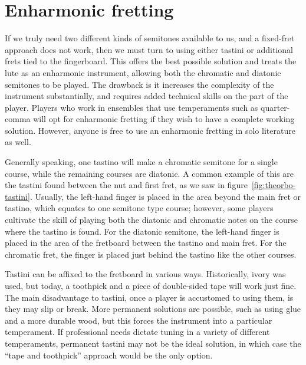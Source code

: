 \section{Enharmonic fretting}

If we truly need two different kinds of semitones available to us, and a fixed-fret
approach does not work, then we must turn to using either tastini or additional frets
tied to the fingerboard.  This offers the best possible solution and treats the lute as
an enharmonic instrument, allowing both the chromatic and diatonic semitones to be
played. The drawback is it increases the complexity of the instrument substantially,
and requires added technical skills on the part of the player. Players who work in
ensembles that use temperaments such as quarter-comma will opt for enharmonic fretting
if they wish to have a complete working solution. However, anyone is free to use an
enharmonic fretting in solo literature as well.

Generally speaking, one tastino will make a chromatic semitone for a single course,
while the remaining courses are diatonic.  A common example of this are the tastini
found between the nut and first fret, as we saw in figure~\ref{fig:theorbo-tastini}.
Usually, the left-hand finger is placed in the area beyond the main fret or tastino,
which equates to one semitone type course; however, some players cultivate the skill of
playing both the diatonic and chromatic notes on the course where the tastino is found.
For the diatonic semitone, the left-hand finger is placed in the area of the fretboard
between the tastino and main fret.  For the chromatic fret, the finger is placed just
behind the tastino like the other courses.

Tastini can be affixed to the fretboard in various ways. Historically, ivory was used,
but today, a toothpick and a piece of double-sided tape will work just fine.  The main
disadvantage to tastini, once a player is accustomed to using them, is they may
slip or break.  More permanent solutions are possible, such as using glue and a more
durable wood, but this forces the instrument into a particular temperament.  If
professional needs dictate tuning in a variety of different temperaments, permanent
tastini may not be the ideal solution, in which case the ``tape and toothpick''
approach would be the only option.

